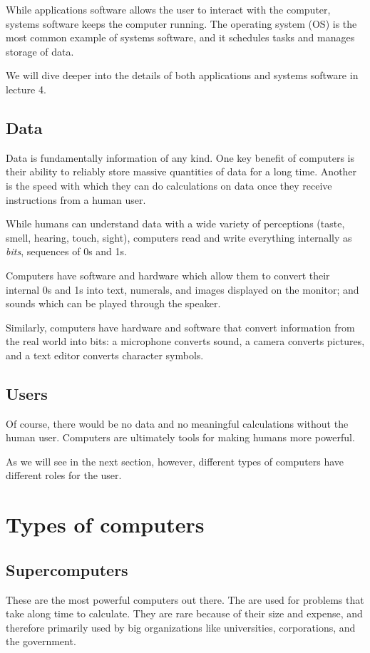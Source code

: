 While applications software allows the user to interact with the computer, systems software keeps the computer running. The operating system (OS) is the most common example of systems software, and it schedules tasks and manages storage of data.

We will dive deeper into the details of both applications and systems software in lecture 4.

\subsection{Data}
Data is fundamentally information of any kind. One key benefit of computers is their ability to reliably store massive quantities of data for a long time. Another is the speed with which they can do calculations on data once they receive instructions from a human user.

While humans can understand data with a wide variety of perceptions (taste,
smell, hearing, touch, sight), computers read and write everything internally as
\textit{bits}, sequences of 0s and 1s.

Computers have software and hardware which allow them to convert their internal 0s and 1s into text, numerals, and images displayed on the monitor; and sounds which can be played through the speaker.

Similarly, computers have hardware and software that convert information from
the real world into bits: a microphone converts sound, a camera converts pictures, and a text editor converts character symbols.

\subsection{Users}
Of course, there would be no data and no meaningful calculations without the human user. Computers are ultimately tools for making humans more powerful.

As we will see in the next section, however, different types of computers have different roles for the user.


\section{Types of computers}

\subsection{Supercomputers}
These are the most powerful computers out there. The are used for problems that take along time to calculate. They are rare because of their size and expense, and therefore primarily used by big organizations like universities, corporations, and the government.

